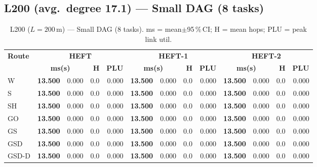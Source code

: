 \documentclass[11pt]{article}
\newcommand{\win}[1]{\textcolor{green!50!black}{\textbf{#1}}}
\begin{document}
\subsection{L200 (avg.\ degree 17.1) --- Small DAG (8 tasks)}
\begin{table}[H]\centering\small
\begin{tabular}{l r@{$\pm$}l r r r@{$\pm$}l r r r@{$\pm$}l r r}
\toprule
\textbf{Route} & \multicolumn{4}{c}{\textbf{HEFT}} & \multicolumn{4}{c}{\textbf{HEFT-1}} & \multicolumn{4}{c}{\textbf{HEFT-2}} \\
\cmidrule(lr){2-5}\cmidrule(lr){6-9}\cmidrule(lr){10-13}
& \multicolumn{2}{c}{\textbf{ms(s)}} & \textbf{H} & \textbf{PLU}& \multicolumn{2}{c}{\textbf{ms(s)}} & \textbf{H} & \textbf{PLU}& \multicolumn{2}{c}{\textbf{ms(s)}} & \textbf{H} & \textbf{PLU} \\
\midrule
  W & \win{13.500} & 0.000 & 0.0 & 0.000 & \win{13.500} & 0.000 & 0.0 & 0.000 & \win{13.500} & 0.000 & 0.0 & 0.000 \\
  S & \win{13.500} & 0.000 & 0.0 & 0.000 & \win{13.500} & 0.000 & 0.0 & 0.000 & \win{13.500} & 0.000 & 0.0 & 0.000 \\
  SH & \win{13.500} & 0.000 & 0.0 & 0.000 & \win{13.500} & 0.000 & 0.0 & 0.000 & \win{13.500} & 0.000 & 0.0 & 0.000 \\
  GO & \win{13.500} & 0.000 & 0.0 & 0.000 & \win{13.500} & 0.000 & 0.0 & 0.000 & \win{13.500} & 0.000 & 0.0 & 0.000 \\
  GS & \win{13.500} & 0.000 & 0.0 & 0.000 & \win{13.500} & 0.000 & 0.0 & 0.000 & \win{13.500} & 0.000 & 0.0 & 0.000 \\
  GSD & \win{13.500} & 0.000 & 0.0 & 0.000 & \win{13.500} & 0.000 & 0.0 & 0.000 & \win{13.500} & 0.000 & 0.0 & 0.000 \\
  GSD-D & \win{13.500} & 0.000 & 0.0 & 0.000 & \win{13.500} & 0.000 & 0.0 & 0.000 & \win{13.500} & 0.000 & 0.0 & 0.000 \\
\bottomrule\end{tabular}
\caption{L200 ($L=200$\,m) --- Small DAG (8 tasks). ms = mean$\pm$95\,\%\,CI; H = mean hops; PLU = peak link util.}
\end{table}
\end{document}
